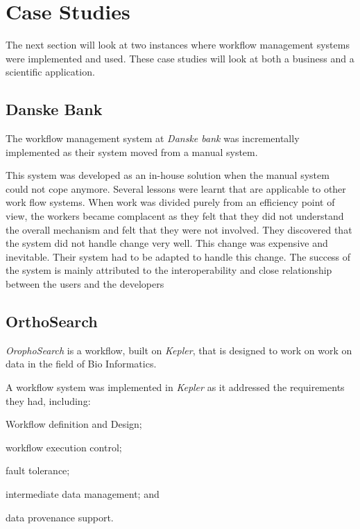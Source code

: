 \documentclass[12pt,a4paper]{report}
\begin{document}
\section{Case Studies}
The next section will look at two instances where workflow management systems
were implemented and used.  These case studies will look at both a business and
a scientific application.
    \subsection*{Danske Bank}
      The workflow management system at \emph{Danske bank} was incrementally
      implemented as their system moved from a manual
      system\cite{Brahe:2007:SWW:1316624.1316661}.

      This system was developed as an in-house solution when the manual system
      could not cope anymore.  Several lessons were learnt that are applicable
      to other work flow systems. When work was divided purely from an
      efficiency point of view, the workers became complacent as they felt that
      they did not understand the overall mechanism and felt that they were not
      involved. They discovered that the system did not handle change very
      well. This change was expensive and inevitable. Their system had to be
      adapted to handle this change. The success of the system is mainly
      attributed to the interoperability and close relationship between the
      users and the developers

    \subsection*{OrthoSearch}
      \emph{OrophoSearch} is a workflow, built on \emph{Kepler}, that is
      designed to work on work on data in the field of Bio Informatics.
      \cite{daCruz:2008:OSW:1363686.1363983}

      A workflow system was implemented in \emph{Kepler} as it addressed the
      requirements they had, including: \begin{inparaenum}[(i)] \item Workflow
      definition and Design; \item workflow execution control; \item fault
      tolerance; \item intermediate data management; and \item data provenance
      support.  \end{inparaenum}
\end{document}
